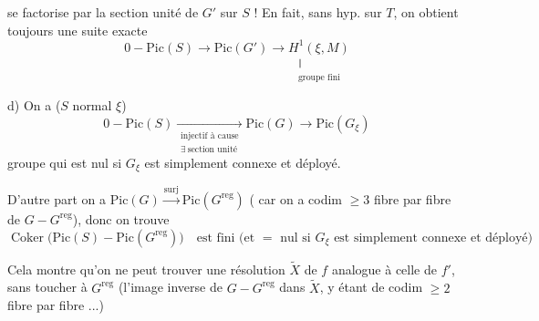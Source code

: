 se factorise par la section unité de $G'$ sur $S$ ! En fait, sans hyp. sur $T$, on obtient toujours une suite exacte
\[
0-\mathrm{Pic}(S)\longrightarrow\mathrm{Pic}(G')\longrightarrow
\underset{\substack{\Vert\\\text{groupe fini}}}{H^1(\xi,M)}
\]

d) On a  ($S$ normal  $\xi$)
\[
0-\mathrm{Pic}(S)\underset{\substack{\text{injectif à cause}\\\exists\ \text{section unité}}}{\longrightarrow}\mathrm{Pic}(G)\longrightarrow\mathrm{Pic}(G_\xi)
\]
groupe  qui est nul si $G_\xi$ est simplement connexe et déployé.

 D'autre part  on a $\mathrm{Pic}(G)\xrightarrow{\mathrm{surj}}\mathrm{Pic}(G^{\mathrm{reg}})$ ( car on a codim $\geq3$ fibre par fibre  de $G-G^{\mathrm{reg}}$), donc on trouve
\[
\operatorname{Coker}\bigl(\mathrm{Pic}(S)-\mathrm{Pic}(G^{\mathrm{reg}})\bigr)
\quad\text{est fini (et $=$ nul si $G_\xi$ est simplement connexe et déployé)}
\]

Cela montre  qu'on ne peut trouver une résolution $\widetilde X$ de $f$ analogue à celle de $f'$, sans toucher à $G^{\mathrm{reg}}$ (l'image inverse de $G-G^{\mathrm{reg}}$ dans $\widetilde X$, y étant de codim $\geq2$ fibre par fibre ...)

